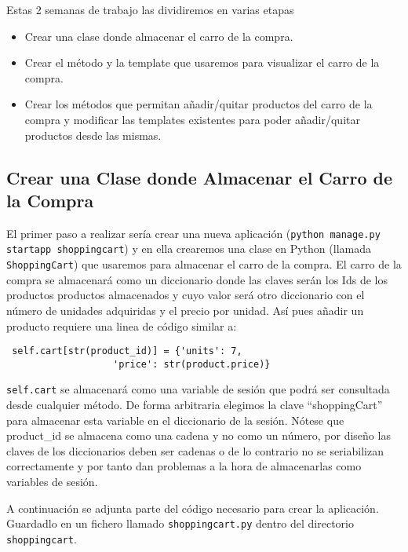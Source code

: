 \documentclass[12pt]{article} %
\newcommand{\ttt}[1]{\texttt{#1}}%
\begin{document}
Estas 2 semanas de trabajo las dividiremos en varias etapas

\begin{itemize}
 \item Crear una clase donde almacenar el carro de la compra.
 \item Crear el método y la template que usaremos para visualizar el carro de la compra.
 \item Crear los métodos que permitan añadir/quitar productos del carro de la compra  y modificar las templates existentes para poder añadir/quitar productos desde las mismas.
\end{itemize}

\subsection{Crear una Clase donde Almacenar el Carro de la Compra}
El primer paso a realizar sería crear una nueva aplicación (\ttt{python manage.py startapp shoppingcart}) y en ella crearemos una clase en Python (llamada \ttt{ShoppingCart}) que usaremos para almacenar el carro de la compra. El carro de la compra se almacenará como un diccionario donde las claves serán los Ids de los productos productos almacenados  y cuyo valor será otro diccionario con el número de unidades adquiridas y el precio por unidad. Así pues añadir un producto requiere una linea de código similar a:

\begin{lstlisting}
 self.cart[str(product_id)] = {'units': 7,
			       'price': str(product.price)}
\end{lstlisting}
\ttt{self.cart}  se almacenará como una variable de sesión que podrá ser consultada desde cualquier método. De forma arbitraria elegimos la clave ``shoppingCart'' para almacenar esta variable en el diccionario de la sesión. Nótese que product\_id se almacena como una cadena y no como un número,
por diseño las claves de los diccionarios deben ser cadenas o de lo contrario no se seriabilizan correctamente y por tanto dan problemas a la hora de almacenarlas como variables de sesión.

A continuación se adjunta parte del código necesario para crear la aplicación. Guardadlo en un fichero llamado \ttt{shoppingcart.py} dentro del directorio \ttt{shoppingcart}.
\end{document}
